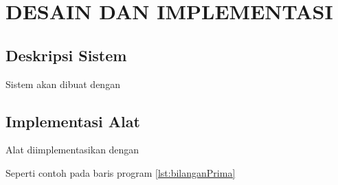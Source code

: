 \chapter{DESAIN DAN IMPLEMENTASI}
\vspace{4ex}

\setlength{\parindent}{7ex}

\section{Deskripsi Sistem}
\vspace{1ex}

Sistem akan dibuat dengan \lipsum[1]
\vspace{0.5ex}

\lipsum[2]
\vspace{0.5ex}

\newpage

\section{Implementasi Alat}
\vspace{1ex}

Alat diimplementasikan dengan \lipsum[3]
\vspace{0.5ex}


\vspace{0.5ex}

Seperti contoh pada baris program \ref{lst:bilanganPrima} \lipsum[4]
\vspace{0.5ex}